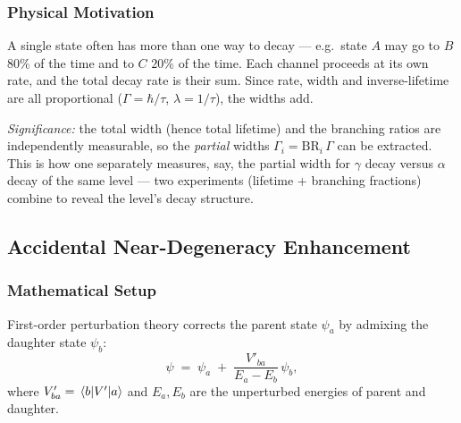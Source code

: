 \subsubsection*{Physical Motivation}
A single state often has more than one way to decay --- e.g.\ state $A$ may go to
$B$ $80\%$ of the time and to $C$ $20\%$ of the time.  Each channel proceeds at
its own rate, and the total decay rate is their sum.  Since rate, width and
inverse-lifetime are all proportional ($\Gamma = \hbar/\tau$,
$\lambda = 1/\tau$), the widths add.

\textit{Significance:} the total width (hence total lifetime) and the branching
ratios are independently measurable, so the \emph{partial} widths
$\Gamma_i = \mathrm{BR}_i\,\Gamma$ can be extracted.  This is how one separately
measures, say, the partial width for $\gamma$ decay versus $\alpha$ decay of the
same level --- two experiments (lifetime + branching fractions) combine to reveal
the level's decay structure.

\subsection{Accidental Near-Degeneracy Enhancement}
\label{subsec:lec08:near_degeneracy}

\subsubsection*{Mathematical Setup}
First-order perturbation theory corrects the parent state $\psi_a$ by admixing
the daughter state $\psi_b$:
\begin{equation}
  \label{eq:lec08:perturbed_state}
  \psi \;=\; \psi_a \;+\; \frac{V'_{ba}}{E_a - E_b}\,\psi_b ,
\end{equation}
where $V'_{ba} = \mel{b}{V'}{a}$ and $E_a,E_b$ are the unperturbed energies of
parent and daughter.

